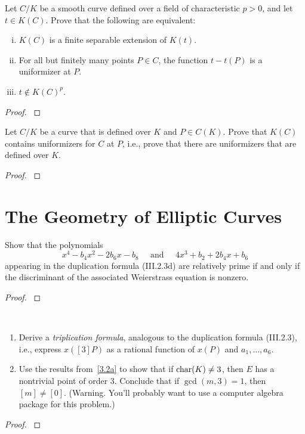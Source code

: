 \documentclass[12pt,reqno]{amsart}
\begin{document}
\begin{exe}\label{2.15}
Let $C/K$ be a smooth curve defined over a field of characteristic $p>0$, and let $t \in K(C)$.  Prove that the following are equivalent:
\begin{enumerate}[(i)]
\item
$K(C)$ is a finite separable extension of $K(t)$.
\item
For all but finitely many points $P\in C$, the function $t-t(P)$ is a uniformizer at $P$.
\item
$t\not\in K(C)^p$.
\end{enumerate}
\begin{proof}\label{s2.15}

\end{proof} 
\end{exe} 

\begin{exe}\label{2.16}
Let $C/K$ be a curve that is defined over $K$ and $P\in C(K)$.  Prove that $K(C)$ contains uniformizers for $C$ at $P$, i.e., prove that there are uniformizers that are defined over $K$.
\begin{proof}\label{s2.16}

\end{proof} 
\end{exe} 

\newpage
\section{The Geometry of Elliptic Curves}\label{3}
\begin{exe}\label{3.1}
Show that the polynomials 
\[
x^4-b_4x^2-2b_6x-b_8\;\;\;\;\;\mbox{and}\;\;\;\;\; 4x^3+b_2+2b_4x+b_6
\]
appearing in the duplication formula (III.2.3d) are relatively prime if and only if the discriminant of the associated Weierstrass equation is nonzero.
\begin{proof}\label{s3.1}

\end{proof} 
\end{exe} 

\begin{exe}\label{3.2}
{\ }
\begin{enumerate}
\item\label{3.2a}
Derive a \emph{triplication formula}, analogous to the duplication formula (III.2.3), i.e., express $x\left([3]P\right)$ as a rational function of $x\left(P\right)$ and $a_1, \hdots, a_6$.
\item\label{3.2b}
Use the results from~\ref{3.2a} to show that if ${\operatorname{char}}(K)\neq 3$, then $E$ has a nontrivial point of order $3$.  Conclude that if $\gcd(m, 3)=1$, then $[m]\neq [0]$.  (Warning.  You'll probably want to use a computer algebra package for this problem.)
\end{enumerate}
\begin{proof}\label{s3.2}

\end{proof} 
\end{exe} 
\end{document}
